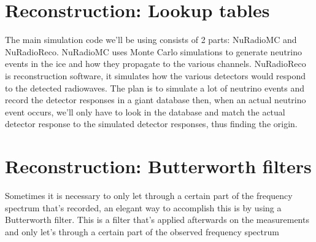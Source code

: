 \documentclass[11pt,a4paper,faculty=we,language=en,doctype=report]{cls/ugent-doc}
\begin{document}
\section{Reconstruction: Lookup tables}
The main simulation code we'll be using consists of 2 parts:
NuRadioMC\cite{Glaser_2020} and NuRadioReco\cite{Glaser_2019}. NuRadioMC uses
Monte Carlo simulations to generate neutrino events in the ice and how they
propagate to the various channels. NuRadioReco is reconstruction software, it
simulates how the various detectors would respond to the detected radiowaves.
The plan is to simulate a lot of neutrino events and record the detector
responses in a giant database then, when an actual neutrino event occurs, we'll
only have to look in the database and match the actual detector response to the
simulated detector responses, thus finding the origin.
\section{Reconstruction: Butterworth filters}
Sometimes it is necessary to only let through a certain part of
the frequency spectrum that's recorded, an elegant way to accomplish
this is by using a Butterworth filter. This is a filter that's
applied afterwards on the measurements and only let's through 
a certain part of the observed frequency spectrum
\end{document}

